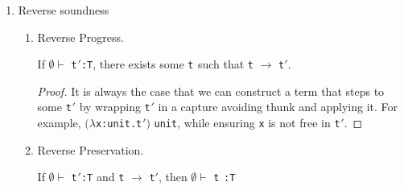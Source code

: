 \documentclass{article}
\newcommand{\term}[1]{{\tt t$_{#1}$}}
\begin{document}
\begin{enumerate}
\begin{enumerate}
         \item \verb|f (if (f x) then (f 0) else 1)| \\

           Won't check because the type of \verb|f| would have to be \verb|Int| $\longrightarrow$ \verb|Bool| for the \term{1} of the \verb|if| and \verb|Int| $\longrightarrow$ \verb|Int| for the \term{2} simultaneously.
       \end{enumerate}

     \item Reverse soundness
       \begin{enumerate}
         \item Reverse Progress.

           \begin{theorem}
             If $\emptyset \vdash$ \term{}$'$\verb|:T|, there exists some \term{} such that \verb|t| $\longrightarrow$ \verb|t|$'$.
           \end{theorem}

           \begin{proof}
             It is always the case that we can construct a term that steps to some \term{}$'$ by wrapping \term{}$'$ in a capture avoiding thunk and applying it. For example, $(\lambda$\verb|x:unit.|\term{}$')$ \verb|unit|, while ensuring \verb|x| is not free in \term{}$'$.
           \end{proof}

         \item Reverse Preservation.
           \begin{theorem}
             If $\emptyset \vdash$ \term{}$'$\verb|:T| and \verb|t| $\longrightarrow$ \verb|t|$'$, then $\emptyset \vdash$ \term{} \verb|:T|
           \end{theorem}


\end{enumerate}
\end{enumerate}
\end{document}
